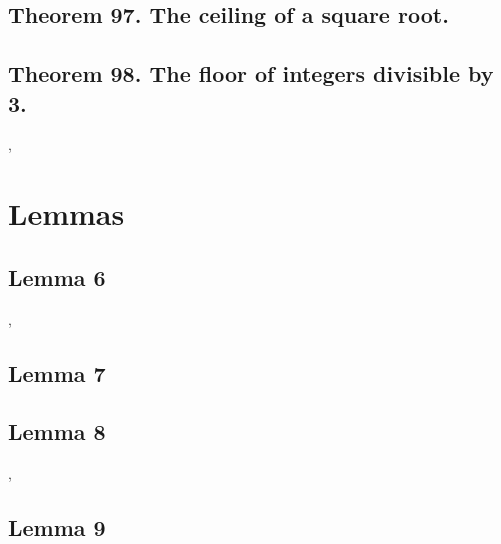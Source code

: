 \documentclass[preview]{standalone}
\begin{document}
\subsection[The ceiling of a square root.]
    {
        \color{section}Theorem 97. \color{black} The ceiling of a square root.
    }

\pagebreak


\subsection[The floor of integers divisible by 3.]
    {
        \color{section}Theorem 98. \color{black} The floor of integers divisible by 3.
    }

\sep
\pagebreak


\section{Lemmas}
\subsection[Lemma 6]{\color{section}Lemma 6}

\sep


\subsection[Lemma 7]{\color{section}Lemma 7}

\pagebreak


\subsection[Lemma 8]{\color{section}Lemma 8}

\sep


\subsection[Lemma 9]{\color{section}Lemma 9}

\pagebreak
\end{document}
